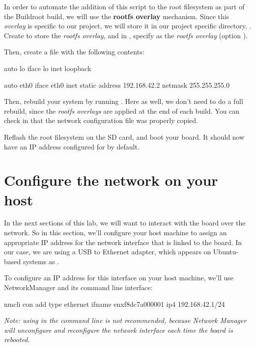 In order to automate the addition of this script to the root
filesystem as part of the Buildroot build, we will use the {\bf rootfs
  overlay} mechanism. Since this {\em overlay} is specific to our
project, we will store it in our project specific directory,
. Create
 to store the {\em rootfs
  overlay}, and in , specify
 as the {\em rootfs
  overlay} (option ).

Then, create a
file with the following contents:

\begin{fileinput}
auto lo
iface lo inet loopback

auto eth0
iface eth0 inet static
      address 192.168.42.2
      netmask 255.255.255.0
\end{fileinput}

Then, rebuild your system by running . Here as well, we
don't need to do a full rebuild, since the {\em rootfs overlays} are
applied at the end of each build. You can check in
 that the network configuration file
was properly copied.

Reflash the root filesystem on the SD card, and boot your board. It
should now have an IP address configured for  by default.

\section{Configure the network on your host}

In the next sections of this lab, we will want to interact with the
board over the network. So in this section, we'll configure your host
machine to assign an appropriate IP address for the network interface
that is linked to the board. In our case, we are using a USB to
Ethernet adapter, which appears on Ubuntu-based systems as
.

To configure an IP address for this interface on your host machine,
we'll use NetworkManager and its command line interface:

\begin{bashinput}
nmcli con add type ethernet ifname enxf8dc7a000001 ip4 192.168.42.1/24
\end{bashinput}

{\em Note: using  in the command line is not recommended,
  because Network Manager will unconfigure and reconfigure the network
  interface each time the board is rebooted.}

